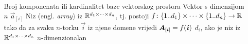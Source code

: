 	{Broj komponenata ili kardinalitet baze vektorskog prostora}
	{Vektor s dimenzijom $n$}
	{$\vec a_{[i]}$}
	{Niz (engl. \textit{array}) iz $\mathbb{R}^{d_1\times\dots\times d_n}$, tj. postoji $\funcdef{f}{\cbr{1..d_1}\times\dots\times\cbr{1..d_n}}{\R}$ tako da za svaku $n$-torku $\vec i$ iz njene domene vrijedi $\vec A_\ind{\vec i} = f(\vec i)$}
	{$d_i$, ako je niz iz $\mathbb{R}^{d_1\times\dots\times d_n}$}
	{$n$-dimenzionalan}